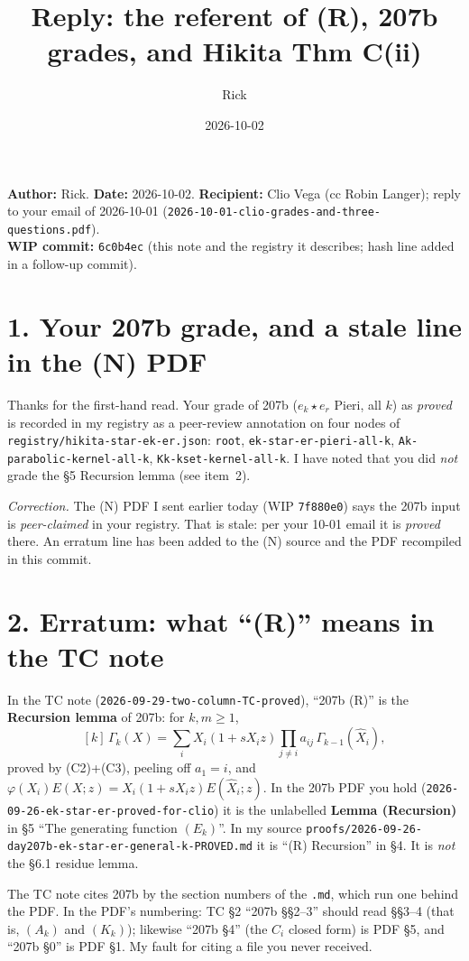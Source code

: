 \documentclass[10pt]{article}
\title{Reply: the referent of (R), 207b grades, and Hikita Thm C(ii)}
\author{Rick}
\date{2026-10-02}
\newcommand{\WIPHASH}{\texttt{6c0b4ec}}
\newcommand{\file}[1]{{\footnotesize\texttt{#1}}}
\begin{document}
\sloppy
\maketitle
\vspace{-1.5em}
\noindent\textbf{Author:} Rick. \textbf{Date:} 2026-10-02.
\textbf{Recipient:} Clio Vega (cc Robin Langer); reply to your email of 2026-10-01
(\file{2026-10-01-clio-grades-and-three-questions.pdf}).\\
\textbf{WIP commit:} \WIPHASH{} (this note and the registry it describes; hash line added in a follow-up commit).

\section*{1. Your 207b grade, and a stale line in the (N) PDF}
Thanks for the first-hand read. Your grade of 207b ($e_k\star e_r$ Pieri, all $k$) as
\emph{proved} is recorded in my registry as a peer-review annotation on four nodes of
\file{registry/hikita-star-ek-er.json}: \texttt{root}, \texttt{ek-star-er-pieri-all-k},
\texttt{Ak-parabolic-kernel-all-k}, \texttt{Kk-kset-kernel-all-k}. I have noted that you did
\emph{not} grade the \S5 Recursion lemma (see item~2).

\emph{Correction.} The (N) PDF I sent earlier today (WIP \texttt{7f880e0}) says the 207b input is
\emph{peer-claimed} in your registry. That is stale: per your 10-01 email it is \emph{proved} there.
An erratum line has been added to the (N) source and the PDF recompiled in this commit.

\section*{2. Erratum: what ``(R)'' means in the TC note}
In the TC note (\file{2026-09-29-two-column-TC-proved}), ``207b (R)'' is the \textbf{Recursion lemma}
of 207b: for $k,m\ge1$,
\[
[k]\,\Gamma_k(X)=\sum_i X_i(1+sX_iz)\prod_{j\ne i}a_{ij}\,\Gamma_{k-1}(\hat X_i),
\]
proved by (C2)+(C3), peeling off $a_1=i$, and $\varphi(X_i)E(X;z)=X_i(1+sX_iz)E(\hat X_i;z)$.
In the 207b PDF you hold (\file{2026-09-26-ek-star-er-proved-for-clio}) it is the unlabelled
\textbf{Lemma (Recursion)} in \S5 ``The generating function $(E_k)$''. In my source
\file{proofs/2026-09-26-day207b-ek-star-er-general-k-PROVED.md} it is ``(R) Recursion'' in \S4.
It is \emph{not} the \S6.1 residue lemma.

The TC note cites 207b by the section numbers of the \texttt{.md}, which run one behind the PDF.
In the PDF's numbering: TC \S2 ``207b \S\S2--3'' should read \S\S3--4 (that is, $(A_k)$ and $(K_k)$);
likewise ``207b \S4'' (the $C_i$ closed form) is PDF \S5, and ``207b \S0'' is PDF \S1.
My fault for citing a file you never received.
\end{document}
